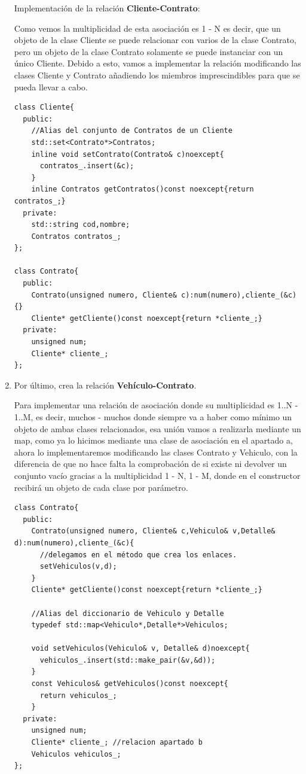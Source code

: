 \begin{enumerate}[label =\alph*)]
  Implementación de la relación \textbf{Cliente-Contrato}:

  Como vemos la multiplicidad de esta asociación es 1 - N es decir, que un objeto de la clase Cliente se puede relacionar con varios de la clase Contrato, pero un objeto de la clase Contrato solamente se puede instanciar con un único Cliente. Debido a esto, vamos a implementar la relación modificando las clases Cliente y Contrato añadiendo los miembros imprescindibles para que se pueda llevar a cabo.
\begin{verbatim}
class Cliente{
  public:
    //Alias del conjunto de Contratos de un Cliente
    std::set<Contrato*>Contratos;
    inline void setContrato(Contrato& c)noexcept{
      contratos_.insert(&c);
    }
    inline Contratos getContratos()const noexcept{return contratos_;}
  private:
    std::string cod,nombre;
    Contratos contratos_;
};

class Contrato{
  public:
    Contrato(unsigned numero, Cliente& c):num(numero),cliente_(&c){}
    Cliente* getCliente()const noexcept{return *cliente_;}
  private:
    unsigned num;
    Cliente* cliente_;
};
\end{verbatim}

\item Por último, crea la relación \textbf{Vehículo-Contrato}.
  
  Para implementar una relación de asociación donde su multiplicidad es 1..N - 1..M, es decir, muchos - muchos donde siempre va a haber como mínimo un objeto de ambas clases relacionados, esa unión vamos a realizarla mediante un map, como ya lo hicimos mediante una clase de asociación en el apartado a, ahora lo implementaremos modificando las clases Contrato y Vehiculo, con la diferencia de que no hace falta la comprobación de si existe ni devolver un conjunto vacío gracias a la multiplicidad 1 - N, 1 - M, donde en el constructor recibirá un objeto de cada clase por parámetro.
\begin{verbatim}
class Contrato{
  public:
    Contrato(unsigned numero, Cliente& c,Vehiculo& v,Detalle& d):num(numero),cliente_(&c){
      //delegamos en el método que crea los enlaces.
      setVehiculos(v,d);
    }
    Cliente* getCliente()const noexcept{return *cliente_;}

    //Alias del diccionario de Vehiculo y Detalle
    typedef std::map<Vehiculo*,Detalle*>Vehiculos;

    void setVehiculos(Vehiculo& v, Detalle& d)noexcept{
      vehiculos_.insert(std::make_pair(&v,&d));
    }
    const Vehiculos& getVehiculos()const noexcept{
      return vehiculos_;
    }
  private:
    unsigned num;
    Cliente* cliente_; //relacion apartado b
    Vehiculos vehiculos_;
};


\end{verbatim}
\end{enumerate}
